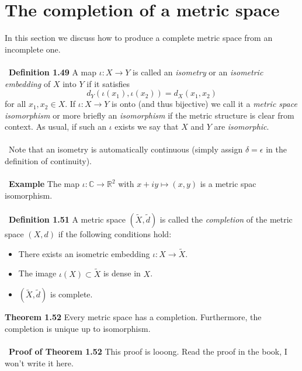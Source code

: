 \documentclass[12 pt]{article}
\newcommand{\R}{\mathbb{R}}
\newcommand{\C}{\mathbb{C}}
\numberwithin{equation}{section}
\begin{document}
{\section{The completion of a metric space}
In this section we discuss how to produce a complete metric space from an incomplete one.\\
\\
\
\textbf{Definition 1.49} A map $\iota: X \to Y$ is called an \textit{isometry} or an \textit{isometric embedding} of $X$ into $Y$ if it satisfies \begin{equation*}
d_Y(\iota(x_1), \iota(x_2)) = d_X(x_1, x_2)
\end{equation*}
for all $x_1, x_2 \in X$. If $\iota: X \to Y$ is onto (and thus bijective) we call it a \textit{metric space isomorphism} or more briefly an \textit{isomorphism} if the metric structure is clear from context. As usual, if such an $\iota$ exists we say that $X$ and $Y$ are \textit{isomorphic}.\\
\\
\
Note that an isometry is automatically continuous (simply assign $\delta = \epsilon$ in the definition of continuity).\\
\\
\
\textbf{Example} The map $\iota: \C \to \R^2$ with $x+iy \mapsto (x,y)$ is a metric spac isomorphism.\\
\\
\
\textbf{Definition 1.51} A metric space $(\tilde{X}, \tilde{d})$ is called the \textit{completion} of the metric space $(X, d)$ if the following conditions hold: \begin{itemize}
\item There exists an isometric embedding $\iota: X \to \tilde{X}$.
\item The image $\iota(X) \subset \tilde{X}$ is dense in $X$.
\item $(\tilde{X}, \tilde{d})$ is complete.
\end{itemize}
\textbf{Theorem 1.52} Every metric space has a completion. Furthermore, the completion is unique up to isomorphism.\\
\\
\
\textbf{Proof of Theorem 1.52} This proof is looong. Read the proof in the book, I won't write it here.













}
\end{document}
